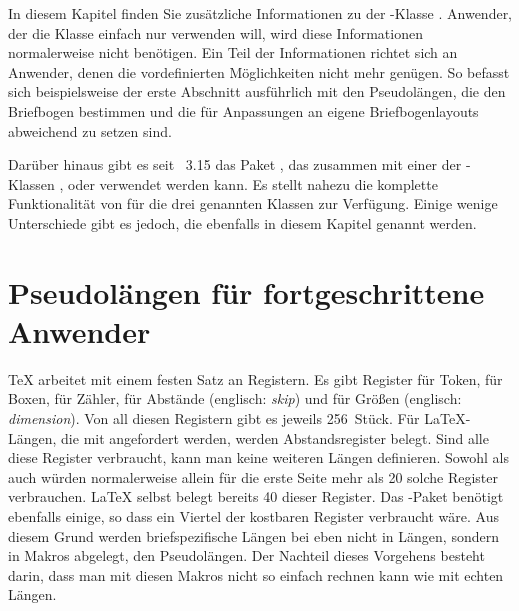 \BeginIndexGroup {} In diesem Kapitel finden Sie
zusätzliche Informationen zu der \KOMAScript-Klasse . %
Anwender, der die Klasse einfach nur verwenden will, wird diese Informationen
normalerweise nicht benötigen. Ein Teil der Informationen richtet sich an
Anwender, denen die vordefinierten Möglichkeiten nicht mehr genügen. So
befasst sich beispielsweise der erste Abschnitt ausführlich mit den
Pseudolängen, die den Briefbogen bestimmen und die für Anpassungen an eigene
Briefbogenlayouts abweichend zu setzen sind.%
\iffalse%
\ Darüber hinaus finden
  sich in diesem Kapitel auch Informationen über Möglichkeiten, die aus
  Gründen der Verbesserung der Kompatibilität zur obsoleten \KOMAScript-Klasse
  \Class{scrlettr} geschaffen wurden. Es wird auch ausführlich erklärt, wie
  man einen Brief dieser veralteten Klasse auf die aktuelle Briefklasse
  übertragen kann.
\fi

%
Darüber hinaus gibt es seit
\KOMAScript~3.15 das Paket
, das zusammen mit einer der \KOMAScript-Klassen
,  oder  verwendet werden
kann. Es stellt nahezu die komplette Funktionalität von  für
die drei genannten Klassen zur Verfügung. Einige wenige Unterschiede gibt es
jedoch, die ebenfalls in diesem Kapitel genannt werden.%


\section{Pseudolängen für fortgeschrittene Anwender}
\BeginIndexGroup
{}

\TeX{} arbeitet mit einem festen Satz an Registern. Es gibt Register für
Token, für Boxen, für Zähler, für Abstände (englisch: \emph{skip}) und für
Größen (englisch: \emph{dimension}). Von all diesen Registern gibt es jeweils
256~Stück. Für \LaTeX{}-Längen, die mit  angefordert werden,
werden Abstandsregister belegt. Sind alle diese Register verbraucht, kann man
keine weiteren Längen definieren. Sowohl  als auch
 würden normalerweise allein für die erste Seite mehr als
20 solche Register verbrauchen. \LaTeX{} selbst belegt bereits 40 dieser
Register. Das \hyperref[cha:typearea]{}%
-Paket benötigt ebenfalls einige, so dass ein Viertel
der kostbaren Register verbraucht wäre. Aus diesem Grund werden
briefspezifische Längen bei \KOMAScript{} eben nicht in Längen, sondern in
Makros abgelegt, den Pseudolängen. Der Nachteil dieses Vorgehens besteht
darin, dass man mit diesen Makros nicht so einfach rechnen kann wie mit echten
Längen.

